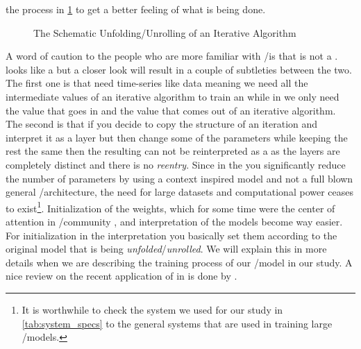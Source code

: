 the process in \cref{fig:deep_unfolding_unrolling} to get a better feeling of what is being done. 
\begin{figure}
  \centering
	\captionsetup{justification=centering}
  \resizebox{35em}{10em}{}
  \caption{The Schematic Unfolding/Unrolling of an Iterative Algorithm}
  \label{fig:deep_unfolding_unrolling}
\end{figure}

A word of caution to the people who are more familiar with \ml/\dl is that \du is not a \rnn\cite{Gregor2010}. \DU looks like a \rnn\cite{Gregor2010} but 
a closer look will result in a couple of subtleties between the two. The first one is that \rnns need time-series like data meaning we need all the intermediate 
values of an iterative algorithm to train an \rnn while in \du we only need the value that goes in and the value that comes out of an iterative algorithm. The second is that if 
you decide to copy the structure of an iteration and interpret it as a layer but then change some of the parameters while keeping the rest the same then 
the resulting \nn can not be reinterpreted as a \rnn as the layers are completely distinct and there is no \emph{reentry}. Since in the \du
 you significantly reduce the number of parameters by using a context inspired model and not a full blown general \ml/\dl architecture, 
 the need for large datasets and computational power ceases to exist\footnote{It is worthwhile to check the system we used for our 
study in \cref{tab:system_specs} to the general systems\cite{Meuer} that are used in training large \ml/\dl models.}. Initialization 
of the weights, which for some time were the center of attention in \ml/\dl community \cite{Glorot2010}\cite{He2015a}, 
and interpretation of the models become way easier. For initialization in the \du interpretation you basically set them according 
to the original model that is being \emph{unfolded}/\emph{unrolled}. We will explain this in more details when we are describing the 
training process of our \ml/\dl model in our study. A nice review on the recent application of \du in \dsip is done by \cite{Monga2019}.






